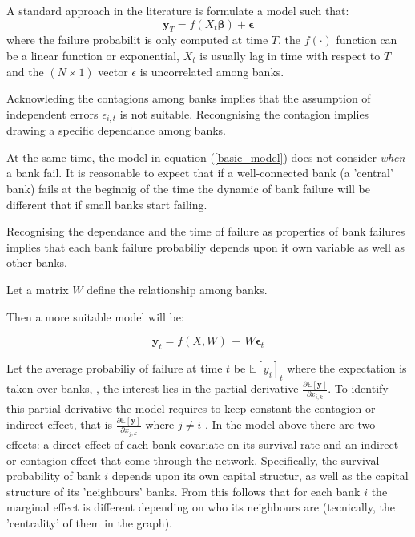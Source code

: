 \documentclass[11pt,final]{article}%
\newcommand{\vect}[1]{\bm{#1}}
\begin{document}
A standard approach in the literature is formulate a model such that:
\begin{equation}
\vect{y}_{T} = f( X_{t} \vect{\beta}) + \vect{\epsilon}
\label{basic_model}
\end{equation}
where the failure probabilit is only computed at time $T$, the $f(\cdot)$   function can be a linear function or exponential, $X_{t}$ is usually lag in time with respect to $T$ and the $(N \times 1)$ vector $\epsilon $ is uncorrelated among banks. 

Acknowleding the contagions among banks implies that the assumption of independent errors $\epsilon_{i, t}$ is not suitable. Recongnising the contagion implies drawing a specific dependance among banks.

At the same time, the model in equation (\ref{basic_model}) does not consider \textit{when} a bank fail. It is reasonable to expect that if a well-connected bank (a 'central' bank) fails at the beginnig of the time the dynamic of bank failure will be different that if small banks start failing. 

Recognising the dependance and the time of failure as properties of bank failures  implies that each bank failure probabiliy depends upon it own variable as well as other banks.

Let a matrix $W$ define the relationship among banks.

Then a more suitable model will be: 

\begin{equation}
\vect{y}_{t} = f(X, W) \, + \, W \vect{\epsilon}_{t}
\end{equation}

Let the average probabiliy of failure at time $t$  be $\mathbb{E}[y_{i}]_{t} $ where the expectation is taken over banks, , the interest lies in the partial derivative $\frac{\partial \mathbb{E} [{\vect{y}}] }{ \partial x_{i, k}} $. To identify this partial derivative the model requires to keep constant the contagion or indirect effect, that is $\frac{\partial \mathbb{E} [{\vect{y}}] }{ \partial x_{j, k}} $ where $j \neq i$ .
In the model above there are two effects: a direct effect of each bank covariate on its survival rate and an indirect or contagion effect that come through the network. Specifically, the survival probability of bank $i$ depends upon its own capital structur, as well as the capital structure of its 'neighbours' banks. 
From this follows that for each bank $i$ the marginal effect is different depending on who its neighbours are (tecnically, the 'centrality' of them in the graph). 
\end{document}
